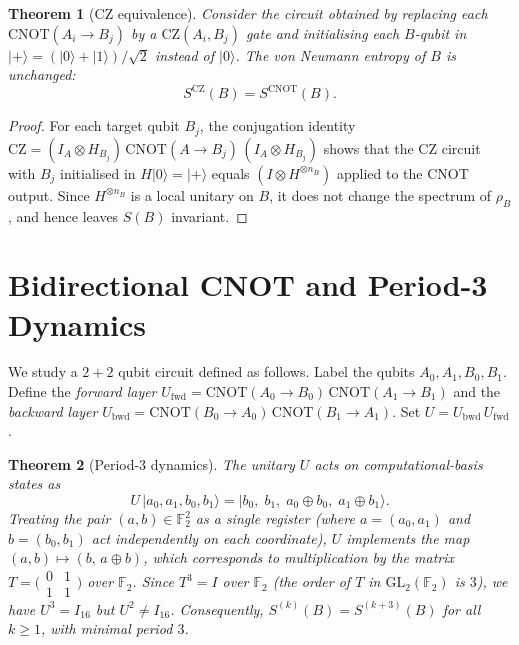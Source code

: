 \documentclass[11pt,a4paper]{article}
\newtheorem{theorem}{Theorem}[section]
\newcommand{\F}{\mathbb{F}}
\newcommand{\VNE}{S}
\begin{document}
\begin{theorem}[CZ equivalence]
\label{thm:cz}
Consider the circuit obtained by replacing each $\mathrm{CNOT}(A_i \to B_j)$
by a $\mathrm{CZ}(A_i, B_j)$ gate and initialising each $B$-qubit in
$|+\rangle = (|0\rangle + |1\rangle)/\sqrt{2}$ instead of $|0\rangle$.
The von Neumann entropy of $B$ is unchanged:
\begin{equation}
  \VNE^{\mathrm{CZ}}(B) = \VNE^{\mathrm{CNOT}}(B).
\end{equation}
\end{theorem}

\begin{proof}
For each target qubit $B_j$, the conjugation identity
$\mathrm{CZ} = (I_A \otimes H_{B_j})\,\mathrm{CNOT}(A \to B_j)\,(I_A \otimes H_{B_j})$
shows that the CZ circuit with $B_j$ initialised in $H|0\rangle = |+\rangle$
equals $(I \otimes H^{\otimes n_B})$ applied to the CNOT output.
Since $H^{\otimes n_B}$ is a local unitary on $B$, it does not change the
spectrum of $\rho_B$, and hence leaves $\VNE(B)$ invariant.
\end{proof}

\section{Bidirectional CNOT and Period-3 Dynamics}
\label{sec:bidir}

We study a $2+2$ qubit circuit defined as follows.
Label the qubits $A_0, A_1, B_0, B_1$.
Define the \emph{forward layer}
$U_{\mathrm{fwd}} = \mathrm{CNOT}(A_0 \to B_0)\,\mathrm{CNOT}(A_1 \to B_1)$
and the \emph{backward layer}
$U_{\mathrm{bwd}} = \mathrm{CNOT}(B_0 \to A_0)\,\mathrm{CNOT}(B_1 \to A_1)$.
Set $U = U_{\mathrm{bwd}}\,U_{\mathrm{fwd}}$.

\begin{theorem}[Period-3 dynamics]
\label{thm:period3}
The unitary $U$ acts on computational-basis states as
\begin{equation}
  U\,|a_0, a_1, b_0, b_1\rangle
  = |b_0,\; b_1,\; a_0 \oplus b_0,\; a_1 \oplus b_1\rangle.
  \label{eq:U_action}
\end{equation}
Treating the pair $(a, b) \in \F_2^2$ as a single register (where
$a = (a_0, a_1)$ and $b = (b_0, b_1)$ act independently on each
coordinate), $U$ implements the map $(a, b) \mapsto (b,\, a \oplus b)$,
which corresponds to multiplication by the matrix
$T = \bigl(\begin{smallmatrix} 0 & 1 \\ 1 & 1 \end{smallmatrix}\bigr)$
over $\F_2$.
Since $T^3 = I$ over $\F_2$ (the order of $T$ in $\mathrm{GL}_2(\F_2)$ is $3$),
we have $U^3 = I_{16}$ but $U^2 \neq I_{16}$.
Consequently, $\VNE^{(k)}(B) = \VNE^{(k+3)}(B)$ for all $k \geq 1$,
with minimal period $3$.
\end{theorem}
\end{document}
